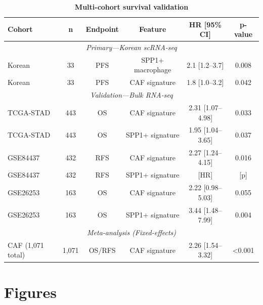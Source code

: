 \documentclass[12pt,twoside]{article}
\begin{document}
\begin{table}[H]
\centering
\caption{\textbf{Multi-cohort survival validation}}
\label{tab:3}
\small
\begin{tabular}{l c c c c c}
\toprule
\textbf{Cohort} & \textbf{n} & \textbf{Endpoint} & \textbf{Feature} & \textbf{HR [95\% CI]} & \textbf{p-value} \\
\midrule
\multicolumn{6}{c}{\textit{Primary—Korean scRNA-seq}} \\
Korean & 33 & PFS & SPP1+ macrophage & 2.1 [1.2--3.7] & 0.008 \\
Korean & 33 & PFS & CAF signature & 1.8 [1.0--3.2] & 0.042 \\
\midrule
\multicolumn{6}{c}{\textit{Validation—Bulk RNA-seq}} \\
TCGA-STAD & 443 & OS & CAF signature & 2.31 [1.07--4.98] & 0.033 \\
TCGA-STAD & 443 & OS & SPP1+ signature & 1.95 [1.04--3.65] & 0.037 \\
GSE84437 & 432 & RFS & CAF signature & 2.27 [1.24--4.15] & 0.016 \\
GSE84437 & 432 & RFS & SPP1+ signature & [HR] & [p] \\
GSE26253 & 163 & OS & CAF signature & 2.22 [0.98--5.03] & 0.055 \\
GSE26253 & 163 & OS & SPP1+ signature & 3.44 [1.48--7.99] & 0.004 \\
\midrule
\multicolumn{6}{c}{\textit{Meta-analysis (Fixed-effects)}} \\
CAF (1,071 total) & 1,071 & OS/RFS & CAF signature & 2.26 [1.54--3.32] & <0.001 \\
\bottomrule
\end{tabular}
\end{table}

\clearpage


\section*{Figures}
\end{document}

